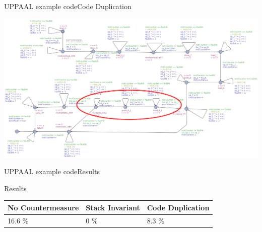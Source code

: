 \begin{frame}{UPPAAL example code}{Code Duplication}
\begin{adjustwidth}{-2cm}{-2cm}
\begin{center}
\includegraphics[scale=0.22]{figures/tinyJCLdup.png}
\end{center}
\end{adjustwidth}
\end{frame}

\begin{frame}{UPPAAL example code}{Results}
\begin{block}{Results}
\begin{table}[]
\centering
\begin{tabular}{l|l|l}
No Countermeasure & Stack Invariant & Code Duplication \\ \hline
16.6 \%           & 0 \%            & 8.3 \%          
\end{tabular}
\end{table}
\end{block}
\end{frame}

